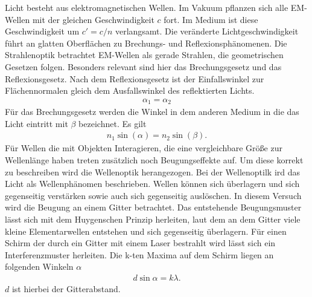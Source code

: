 Licht besteht aus elektromagnetischen Wellen.
Im Vakuum pflanzen sich alle EM-Wellen mit der gleichen Geschwindigkeit $c$ fort.
Im Medium ist diese Geschwindigkeit um $c'=c/n$ verlangsamt.
Die veränderte Lichtgeschwindigkeit führt an glatten Oberflächen zu Brechungs- und Reflexionsphänomenen.
Die Strahlenoptik betrachtet EM-Wellen als gerade Strahlen, die geometrischen Gesetzen folgen.
Besonders relevant sind hier das Brechungsgesetz und das Reflexionsgesetz.
Nach dem Reflexionsgesetz ist der Einfallswinkel zur Flächennormalen gleich dem Ausfallswinkel des reflektierten Lichts.
\begin{align}
    \alpha_1 =\alpha_2
    \label{eq:reflexion}
\end{align}
Für das Brechungsgesetz werden die Winkel in dem anderen Medium in die das Licht eintritt mit $\beta$ bezeichnet.
Es gilt 
\begin{align}
    n_1 \sin(\alpha) = n_2 \sin(\beta).
    \label{eq:brechung}
\end{align}
Für Wellen die mit Objekten Interagieren, die eine vergleichbare Größe zur Wellenlänge haben 
treten zusätzlich noch Beugungseffekte auf.
Um diese korrekt zu beschreiben wird die Wellenoptik herangezogen.
Bei der Wellenoptilk ird das Licht als Wellenphänomen beschrieben.
Wellen können sich überlagern und sich gegenseitig verstärken sowie auch sich gegenseitig auslöschen.
In diesem Versuch wird die Beugung an einem Gitter betrachtet.
Das entstehende Beugungsmuster lässt sich mit dem Huygenschen Prinzip herleiten,
laut dem an dem Gitter viele kleine Elementarwellen entstehen und sich gegenseitig überlagern.
Für einen Schirm der durch ein Gitter mit einem Laser bestrahlt wird lässt sich ein Interferenzmuster herleiten.
Die k-ten Maxima auf dem Schirm liegen an folgenden Winkeln $\alpha$
\begin{align}
    d \sin{\alpha} = k \lambda.
    \label{eq:beugung}
\end{align}
$d$ ist hierbei der Gitterabstand.